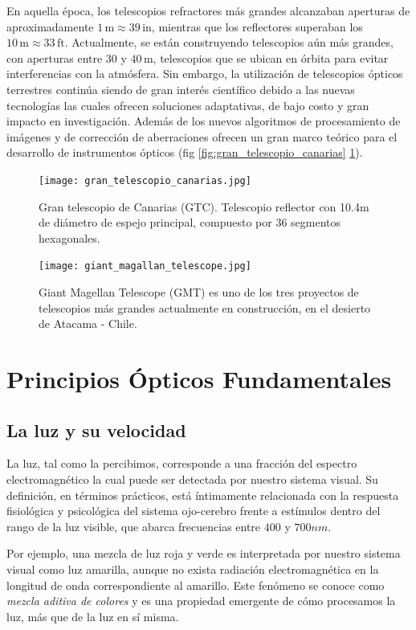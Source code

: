 En aquella época, los telescopios refractores más grandes alcanzaban aperturas de aproximadamente $1\,\mathrm{m} \approx 39\,\mathrm{in}$, mientras que los reflectores superaban los $10\,\mathrm{m} \approx 33\,\mathrm{ft}$. Actualmente, se están construyendo telescopios aún más grandes, con aperturas entre $30$ y $40\,\mathrm{m}$, telescopios que se ubican en órbita para evitar interferencias con la atmósfera. Sin embargo, la utilización de telescopios ópticos terrestres continúa siendo de gran interés científico debido a las nuevas tecnologías las cuales ofrecen soluciones adaptativas, de bajo costo y gran impacto en investigación. Además de los nuevos algoritmos de procesamiento de imágenes y de corrección de aberraciones ofrecen un gran marco teórico para el desarrollo de instrumentos ópticos (fig \ref{fig:gran_telescopio_canarias} \ref{fig:gmt_chile}). 

\begin{figure}[H]
	\centering
	\texttt{[image: gran\_telescopio\_canarias.jpg]}
	\caption{Gran telescopio de Canarias (GTC). Telescopio reflector con 10.4m de diámetro de espejo principal, compuesto por 36 segmentos hexagonales.}
	\label{fig:gran_telescopio_canarias}
	\texttt{[image: giant\_magallan\_telescope.jpg]}
	\caption{Giant Magellan Telescope (GMT) es uno de los tres proyectos de telescopios más grandes actualmente en construcción, en el desierto de Atacama - Chile.}
	\label{fig:gmt_chile}
\end{figure}


 


\section{Principios Ópticos Fundamentales}
\subsection*{La luz y su velocidad}

La luz, tal como la percibimos, corresponde a una fracción del espectro electromagnético la cual puede ser detectada por nuestro sistema visual. Su definición, en términos prácticos, está íntimamente relacionada con la respuesta fisiológica y psicológica del sistema ojo-cerebro frente a estímulos dentro del rango de la luz visible, que abarca frecuencias entre $400$ y $700 nm$.

Por ejemplo, una mezcla de luz roja y verde es interpretada por nuestro sistema visual como luz amarilla, aunque no exista radiación electromagnética en la longitud de onda correspondiente al amarillo. Este fenómeno se conoce como \textit{mezcla aditiva de colores} y es una propiedad emergente de cómo procesamos la luz, más que de la luz en sí misma.

